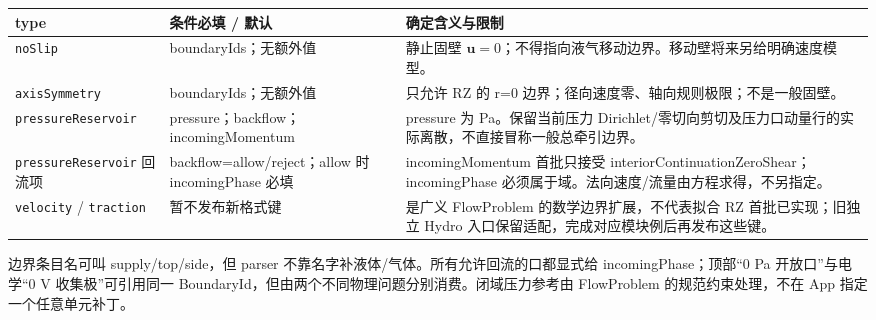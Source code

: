 \documentclass[UTF8,a4paper,11pt,fontset=fandol]{ctexart}
\numberwithin{equation}{section}
\newcommand{\code}[1]{\nolinkurl{#1}}
\begin{document}
\begin{longtable}{@{}P{.24\textwidth}P{.31\textwidth}P{.39\textwidth}@{}}
\toprule type & 条件必填 / 默认 & 确定含义与限制\\\midrule\endhead
\code{noSlip} & boundaryIds；无额外值 & 静止固壁 $\bm u=0$；不得指向液气移动边界。移动壁将来另给明确速度模型。\\
\code{axisSymmetry} & boundaryIds；无额外值 & 只允许 RZ 的 r=0 边界；径向速度零、轴向规则极限；不是一般固壁。\\
\code{pressureReservoir} & pressure；backflow；incomingMomentum & pressure 为 Pa。保留当前压力 Dirichlet/零切向剪切及压力口动量行的实际离散，不直接冒称一般总牵引边界。\\
\code{pressureReservoir} 回流项 & backflow=allow/reject；allow 时 incomingPhase 必填 & incomingMomentum 首批只接受 interiorContinuationZeroShear；incomingPhase 必须属于域。法向速度/流量由方程求得，不另指定。\\
\code{velocity} / \code{traction} & 暂不发布新格式键 & 是广义 FlowProblem 的数学边界扩展，不代表拟合 RZ 首批已实现；旧独立 Hydro 入口保留适配，完成对应模块例后再发布这些键。\\
\bottomrule
\end{longtable}
边界条目名可叫 supply/top/side，但 parser 不靠名字补液体/气体。所有允许回流的口都显式给 incomingPhase；顶部“0 Pa 开放口”与电学“0 V 收集极”可引用同一 BoundaryId，但由两个不同物理问题分别消费。闭域压力参考由 FlowProblem 的规范约束处理，不在 App 指定一个任意单元补丁。
\end{document}
